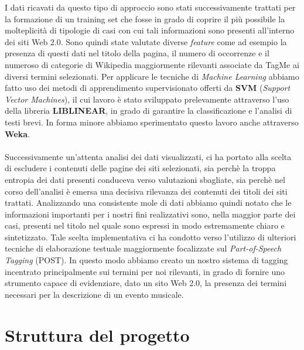 \documentclass[a4paper]{report}
\begin{document}
I dati ricavati da questo tipo di approccio sono stati successivamente trattati per la formazione di un training set che fosse in grado di coprire  il più possibile la molteplicità di tipologie di casi con cui tali informazioni sono presenti all'interno dei siti Web 2.0. Sono quindi state valutate diverse \textit{feature} come ad esempio la presenza di questi dati nel titolo della pagina, il numero di occorrenze e il numeroso di categorie di Wikipedia maggiormente rilevanti associate da TagMe ai diversi termini selezionati. Per applicare le tecniche di \textit{Machine Learning} abbiamo fatto uso dei metodi di apprendimento supervisionato offerti da \textbf{SVM} (\textit{Support Vector Machines}), il cui lavoro è stato sviluppato prelevamente attraverso l'uso della libreria \textbf{LIBLINEAR}\cite{4}, in grado di garantire la classificazione e l'analisi di testi brevi. In forma minore abbiamo sperimentato questo lavoro anche attraverso \textbf{Weka}\cite{5}. \\
\\
Successivamente un'attenta analisi dei dati visualizzati, ci ha portato alla scelta di escludere i contenuti delle pagine dei siti selezionati, sia perchè la troppa entropia dei dati presenti conduceva verso valutazioni sbagliate, sia perchè nel corso dell'analisi è emersa una decisiva rilevanza dei contenuti dei titoli dei siti trattati. Analizzando una consistente mole di dati abbiamo quindi notato che le informazioni importanti per i nostri fini realizzativi sono, nella maggior parte dei casi, presenti nel titolo nel quale sono espressi in modo estremamente chiaro e sintetizzato. Tale scelta implementativa ci ha condotto verso l'utilizzo di ulteriori tecniche di elaborazione testuale maggiormente focalizzate sul \textit{Part-of-Speech Tagging} (POST). In questo modo abbiamo creato un nostro sistema di tagging incentrato principalmente sui termini per noi rilevanti, in grado di fornire uno strumento capace di evidenziare, dato un sito Web 2.0, la presenza dei termini necessari per la descrizione di un evento musicale. 

\chapter{Struttura del progetto}
\end{document}
